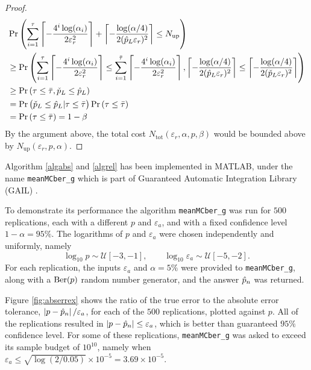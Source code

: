 \documentclass{iitthesis}
\begin{document}
\begin{proof}
\begin{align}
&\Pr\left (\sum_{i=1}^{\tau} \left \lceil -\frac{4^i \log(\alpha_i)} {2\varepsilon_r^2 } \right\rceil+\left \lceil -\frac{\log (\alpha/4)}{2  (\hat{p}_L \varepsilon_{r})^2} \right \rceil \leq N_{\text{up}}\right)\\ & \geq \Pr \left(\sum_{i=1}^{\tau} \left \lceil -\frac{4^i \log(\alpha_i)} {2\varepsilon_r^2 } \right\rceil \leq \sum_{i=1}^{\bar{\tau}} \left \lceil -\frac{4^i \log(\alpha_i)} {2\varepsilon_r^2 } \right\rceil , \left \lceil -\frac{\log (\alpha/4)}{2  (\hat{p}_L \varepsilon_{r})^2} \right \rceil \leq \left \lceil -\frac{\log (\alpha/4)}{2  (\check{p}_L \varepsilon_{r})^2} \right \rceil\right)\\&
\geq \Pr \left ( \tau \leq \bar{\tau}, \check{p}_L \leq \hat{p}_L \right ) \\&
 = \Pr \left ( \check{p}_L \leq \hat{p}_L | \tau \leq \bar{\tau}\right )\Pr \left( \tau \leq \bar{\tau}\right) \\&
 = \Pr \left( \tau \leq \bar{\tau}\right) = 1-\beta
\end{align}
By the argument above, the total cost $N_{\text{tot}}(\varepsilon_r,\alpha,p,\beta)$ would be bounded above by $N_{\text{up}}(\varepsilon_r, p,\alpha)$.
\end{proof}

\label{sec:meanMCbergexample}
Algorithm \ref{algabs} and \ref{algrel} has been implemented in MATLAB, under the name {\tt meanMCber\_g} which is part of Guaranteed Automatic Integration Library (GAIL) \cite{GAIL_1_3}.

To demonstrate its performance the algorithm {\tt meanMCber\_g} was run for $500$ replications, each with a different $p$ and $\varepsilon_a$, and with a fixed confidence level $1-\alpha=95\%$. The logarithms of $p$ and $\varepsilon_a$ were chosen independently and uniformly, namely 
\[
\log_{10} p \sim \mathcal{U}[-3,-1], \qquad \log_{10} \varepsilon_a \sim \mathcal{U}[-5,-2].
\]
For each replication, the inputs $\varepsilon_a$ and $\alpha=5\%$ were provided to {\tt meanMCber\_g}, along with a $\operatorname{Ber}(p)$ random number generator, and the answer $\hat{p}_n$ was returned.  

Figure \ref{fig:abserrex} shows the ratio of the true error to the absolute error tolerance, $\left \lvert p-\hat{p}_n \right \rvert/\varepsilon_a$, for each of the $500$ replications, plotted against $p$.  All of the replications resulted in $\left \lvert p-\hat{p}_n \right \rvert \le \varepsilon_a$, which is better than guaranteed $95\%$ confidence level.  For some of these replications, {\tt meanMCber\_g} was asked to exceed its sample budget of $10^{10}$, namely when $\varepsilon_a \le \sqrt{\log(2/0.05)} \times 10^{-5} = 3.69 \times 10^{-5}$.
\end{document}
